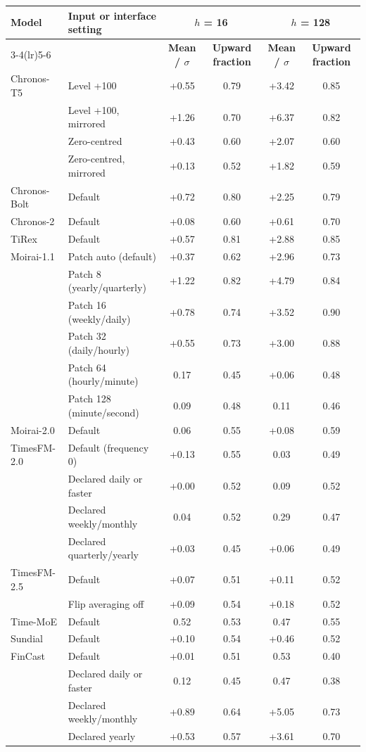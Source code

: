 \begin{tabular}{@{}llcccc@{}}
\toprule
\textbf{Model} & \textbf{Input or interface setting} & \multicolumn{2}{c}{\textbf{$h$ = 16}} & \multicolumn{2}{c}{\textbf{$h$ = 128}} \\
\cmidrule(lr){3-4}\cmidrule(lr){5-6}
 &  & \textbf{Mean / $\sigma$} & \textbf{Upward fraction} & \textbf{Mean / $\sigma$} & \textbf{Upward fraction} \\
\midrule
Chronos-T5 & Level +100 & +0.55 & 0.79 & +3.42 & 0.85 \\
 & Level +100, mirrored & +1.26 & 0.70 & +6.37 & 0.82 \\
 & Zero-centred & +0.43 & 0.60 & +2.07 & 0.60 \\
 & Zero-centred, mirrored & +0.13 & 0.52 & +1.82 & 0.59 \\
\addlinespace[2pt]
Chronos-Bolt & Default & +0.72 & 0.80 & +2.25 & 0.79 \\
\addlinespace[2pt]
Chronos-2 & Default & +0.08 & 0.60 & +0.61 & 0.70 \\
\addlinespace[2pt]
TiRex & Default & +0.57 & 0.81 & +2.88 & 0.85 \\
\addlinespace[2pt]
Moirai-1.1 & Patch auto (default) & +0.37 & 0.62 & +2.96 & 0.73 \\
 & Patch 8 (yearly/quarterly) & +1.22 & 0.82 & +4.79 & 0.84 \\
 & Patch 16 (weekly/daily) & +0.78 & 0.74 & +3.52 & 0.90 \\
 & Patch 32 (daily/hourly) & +0.55 & 0.73 & +3.00 & 0.88 \\
 & Patch 64 (hourly/minute) & \textminus{}0.17 & 0.45 & +0.06 & 0.48 \\
 & Patch 128 (minute/second) & \textminus{}0.09 & 0.48 & \textminus{}0.11 & 0.46 \\
\addlinespace[2pt]
Moirai-2.0 & Default & \textminus{}0.06 & 0.55 & +0.08 & 0.59 \\
\addlinespace[2pt]
TimesFM-2.0 & Default (frequency 0) & +0.13 & 0.55 & \textminus{}0.03 & 0.49 \\
 & Declared daily or faster & +0.00 & 0.52 & \textminus{}0.09 & 0.52 \\
 & Declared weekly/monthly & \textminus{}0.04 & 0.52 & \textminus{}0.29 & 0.47 \\
 & Declared quarterly/yearly & +0.03 & 0.45 & +0.06 & 0.49 \\
\addlinespace[2pt]
TimesFM-2.5 & Default & +0.07 & 0.51 & +0.11 & 0.52 \\
 & Flip averaging off & +0.09 & 0.54 & +0.18 & 0.52 \\
\addlinespace[2pt]
Time-MoE & Default & \textminus{}0.52 & 0.53 & \textminus{}0.47 & 0.55 \\
\addlinespace[2pt]
Sundial & Default & +0.10 & 0.54 & +0.46 & 0.52 \\
\addlinespace[2pt]
FinCast & Default & +0.01 & 0.51 & \textminus{}0.53 & 0.40 \\
 & Declared daily or faster & \textminus{}0.12 & 0.45 & \textminus{}0.47 & 0.38 \\
 & Declared weekly/monthly & +0.89 & 0.64 & +5.05 & 0.73 \\
 & Declared yearly & +0.53 & 0.57 & +3.61 & 0.70 \\
\bottomrule
\end{tabular}
